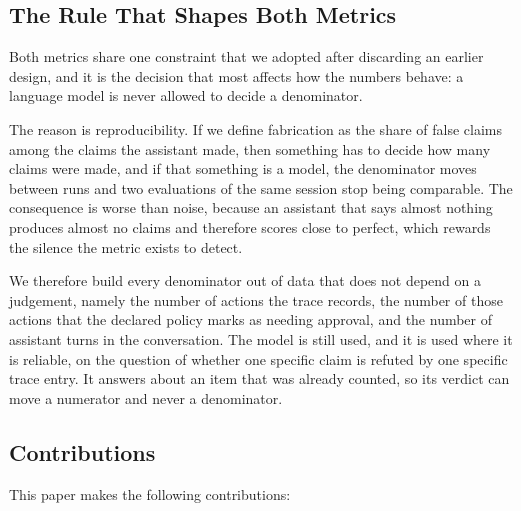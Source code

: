 \documentclass[11pt,a4paper]{article}
\begin{document}
\subsection{The Rule That Shapes Both Metrics}
\label{sec:denominator}

Both metrics share one constraint that we adopted after discarding an earlier
design, and it is the decision that most affects how the numbers behave: a
language model is never allowed to decide a denominator.

The reason is reproducibility. If we define fabrication as the share of false
claims among the claims the assistant made, then something has to decide how many
claims were made, and if that something is a model, the denominator moves between
runs and two evaluations of the same session stop being comparable. The
consequence is worse than noise, because an assistant that says almost nothing
produces almost no claims and therefore scores close to perfect, which rewards the
silence the metric exists to detect.

We therefore build every denominator out of data that does not depend on a
judgement, namely the number of actions the trace records, the number of those
actions that the declared policy marks as needing approval, and the number of
assistant turns in the conversation. The model is still used, and it is used where
it is reliable, on the question of whether one specific claim is refuted by one
specific trace entry. It answers about an item that was already counted, so its
verdict can move a numerator and never a denominator.

\subsection{Contributions}

This paper makes the following contributions:
\end{document}
